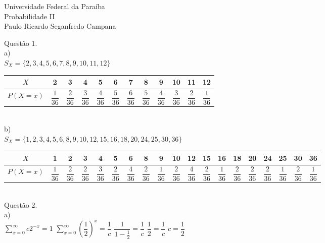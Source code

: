 \documentclass[12pt]{article}
\begin{document}
\begin{center}
	Universidade Federal da Paraíba\\
	Probabilidade II\\
	Paulo Ricardo Seganfredo Campana 
\end{center}
\noindent Questão 1.\\

\noindent a)\\

$S_{X}=\{2,3,4,5,6,7,8,9,10,11,12\}$\\

\begin{tabular}{c|c|c|c|c|c|c|c|c|c|c|c}
	$X$ & 2 & 3 & 4 & 5 & 6 & 7 & 8 & 9 & 10 & 11 & 12 \\
	\hline
	$P(X=x)$ & $\dfrac{1}{36}$ & $\dfrac{2}{36}$ & $\dfrac{3}{36}$ & $\dfrac{4}{36}$ & $\dfrac{5}{36}$ & $\dfrac{6}{36}$ & $\dfrac{5}{36}$ & $\dfrac{4}{36}$ & $\dfrac{3}{36}$ & $\dfrac{2}{36}$ & $\dfrac{1}{36}$ \\	
\end{tabular}\\

\noindent b)\\

$S_{X}=\{1,2,3,4,5,6,8,9,10,12,15,16,18,20,24,25,30,36\}$\\

\noindent\begin{tabular}{c|c|c|c|c|c|c|c|c|c|c|c|c|c|c|c|c|c|c}
	$X$ & 1 & 2 & 3 & 4 & 5 & 6 & 8 & 9 & 10 & 12 & 15 & 16 & 18 & 20 & 24 & 25 & 30 & 36 \\
	\hline
	$P(X=x)$ & $\dfrac{1}{36}$ & $\dfrac{2}{36}$ & $\dfrac{2}{36}$ & $\dfrac{3}{36}$ & $\dfrac{2}{36}$ & $\dfrac{4}{36}$ & $\dfrac{2}{36}$ & $\dfrac{1}{36}$ & $\dfrac{2}{36}$ & $\dfrac{4}{36}$ & $\dfrac{2}{36}$ & $\dfrac{1}{36}$ & $\dfrac{2}{36}$ & $\dfrac{2}{36}$ & $\dfrac{2}{36}$ & $\dfrac{1}{36}$ & $\dfrac{2}{36}$ & $\dfrac{1}{36}$ \\	
\end{tabular}\\

\noindent Questão 2.\\

\noindent a)\\

$\displaystyle\sum_{x=0}^{\infty}c2^{-x}=1$\qquad\qquad
$\displaystyle\sum_{x=0}^{\infty}\left(\dfrac{1}{2}\right)^{x}=\dfrac{1}{c}$\qquad\qquad
$\dfrac{1}{1-\frac{1}{2}}=\dfrac{1}{c}$\qquad\qquad
$\dfrac{1}{2}=\dfrac{1}{c}$\qquad\qquad
$c=\dfrac{1}{2}$\\
\end{document}

